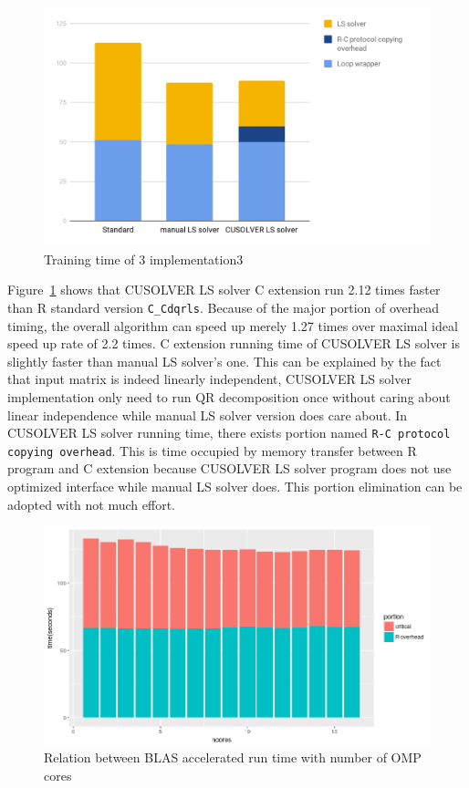 \documentclass[English]{dicomopapers}
\begin{document}
\begin{figure}[ht]
  \vspace*{-0.8cm}
  \centering
  \includegraphics[width=\columnwidth,natwidth=1200,natheight=742]{qr_ret.png}
  \caption{Training time of 3 implementation3}\label{fig:qr_ret}
\end{figure}
Figure~\ref{fig:qr_ret} shows that CUSOLVER LS solver C extension run 2.12 times faster than R standard version \texttt{C\_Cdqrls}. Because of the major portion of overhead timing, the overall algorithm can speed up merely 1.27 times over maximal ideal speed up rate of 2.2 times. C extension running time of CUSOLVER LS solver is slightly faster than manual LS solver's one. This can be explained by the fact that input matrix is indeed linearly independent, CUSOLVER LS solver implementation only need to run QR decomposition once without caring about linear independence while manual LS solver version does care about. In CUSOLVER LS solver running time, there exists portion named \texttt{R-C protocol copying overhead}. This is time occupied by memory transfer between R program and C extension because CUSOLVER LS solver program does not use optimized interface while manual LS solver does. This portion elimination can be adopted with not much effort.\newline

\begin{figure}[ht]
  \vspace*{-0.8cm}
  \centering
  \includegraphics[width=\columnwidth,natwidth=857,natheight=484]{qr_blas_ret.png}
  \caption{Relation between BLAS accelerated run time with number of OMP cores}\label{fig:qr_blas_ret}
\end{figure}
\end{document}
